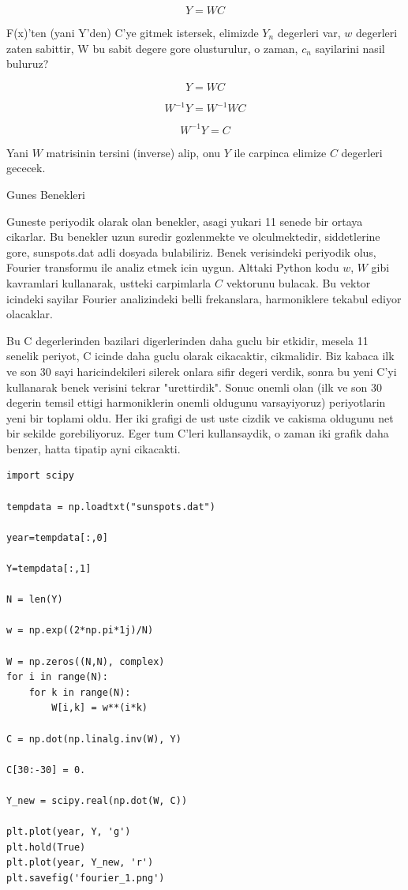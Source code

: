 \documentclass[12pt,fleqn]{article}\usepackage{../common}
\begin{document}
$$ Y = WC $$

F(x)'ten (yani Y'den) C'ye gitmek istersek, elimizde $Y_n$ degerleri var, $w$
degerleri zaten sabittir, W bu sabit degere gore olusturulur, o zaman, $c_n$
sayilarini nasil buluruz?

$$ Y = WC  $$

$$ W^{-1}Y = W^{-1}WC  $$

$$ W^{-1}Y = C $$

Yani $W$ matrisinin tersini (inverse) alip, onu $Y$ ile carpinca elimize $C$
degerleri gececek. 

Gunes Benekleri

Guneste periyodik olarak olan benekler, asagi yukari 11 senede bir ortaya
cikarlar. Bu benekler uzun suredir gozlenmekte ve olculmektedir, siddetlerine
gore, sunspots.dat adli dosyada bulabiliriz. Benek verisindeki periyodik olus,
Fourier transformu ile analiz etmek icin uygun. Alttaki Python kodu $w$, $W$
gibi kavramlari kullanarak, ustteki carpimlarla $C$ vektorunu bulacak. Bu vektor
icindeki sayilar Fourier analizindeki belli frekanslara, harmoniklere tekabul
ediyor olacaklar.

Bu C degerlerinden bazilari digerlerinden daha guclu bir etkidir, mesela 11
senelik periyot, C icinde daha guclu olarak cikacaktir, cikmalidir. Biz kabaca
ilk ve son 30 sayi haricindekileri silerek onlara sifir degeri verdik, sonra bu
yeni C'yi kullanarak benek verisini tekrar "urettirdik". Sonuc onemli olan
(ilk ve son 30 degerin temsil ettigi harmoniklerin onemli oldugunu varsayiyoruz)
periyotlarin yeni bir toplami oldu. Her iki grafigi de ust uste cizdik ve
cakisma oldugunu net bir sekilde gorebiliyoruz. Eger tum C'leri kullansaydik, o
zaman iki grafik daha benzer, hatta tipatip ayni cikacakti.

\begin{verbatim}
import scipy

tempdata = np.loadtxt("sunspots.dat")

year=tempdata[:,0]

Y=tempdata[:,1]

N = len(Y)

w = np.exp((2*np.pi*1j)/N)

W = np.zeros((N,N), complex)
for i in range(N):
    for k in range(N):
        W[i,k] = w**(i*k)
        
C = np.dot(np.linalg.inv(W), Y) 

C[30:-30] = 0.

Y_new = scipy.real(np.dot(W, C))

plt.plot(year, Y, 'g')
plt.hold(True)
plt.plot(year, Y_new, 'r')
plt.savefig('fourier_1.png')
\end{verbatim}
\end{document}
